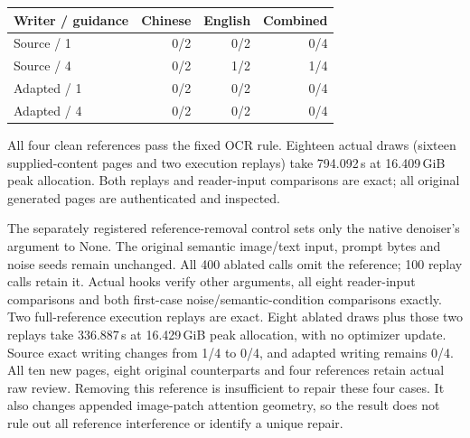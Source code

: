 \documentclass[10pt,a4paper]{article}
\begin{document}
\begin{center}\begin{tabular}{lrrr}
Writer / guidance & Chinese & English & Combined\\\hline
Source / 1 & 0/2 & 0/2 & 0/4\\
Source / 4 & 0/2 & 1/2 & 1/4\\
Adapted / 1 & 0/2 & 0/2 & 0/4\\
Adapted / 4 & 0/2 & 0/2 & 0/4\\
\end{tabular}\end{center}
All four clean references pass the fixed OCR rule. Eighteen actual draws
(sixteen supplied-content pages and two execution replays) take 794.092\,s
at 16.409\,GiB peak allocation. Both replays and reader-input comparisons
are exact; all original generated pages are authenticated and inspected.

The separately registered reference-removal control sets only the native
denoiser's  argument to None. The original semantic
image/text input, prompt bytes and noise seeds remain unchanged. All 400
ablated calls omit the reference; 100 replay calls retain it. Actual hooks
verify other arguments, all eight reader-input comparisons and both first-case
noise/semantic-condition comparisons exactly. Two full-reference execution
replays are exact. Eight ablated draws plus those two replays take 336.887\,s
at 16.429\,GiB peak allocation, with no optimizer update. Source exact writing
changes from 1/4 to 0/4, and adapted writing remains 0/4. All ten new pages,
eight original counterparts and four references retain actual raw review.
Removing this reference is insufficient to repair these four cases. It also
changes appended image-patch attention geometry, so the result does not rule
out all reference interference or identify a unique repair.

\clearpage
{}
\end{document}
